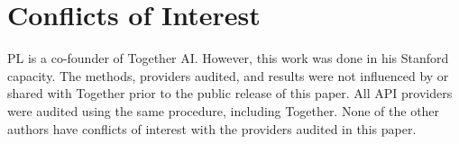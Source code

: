 \section*{Conflicts of Interest}

PL is a co-founder of Together AI. However, this work was done in his Stanford capacity. The methods, providers audited, and results were not influenced by or shared with Together prior to the public release of this paper. All API providers were audited using the same procedure, including Together. None of the other authors have conflicts of interest with the providers audited in this paper.
